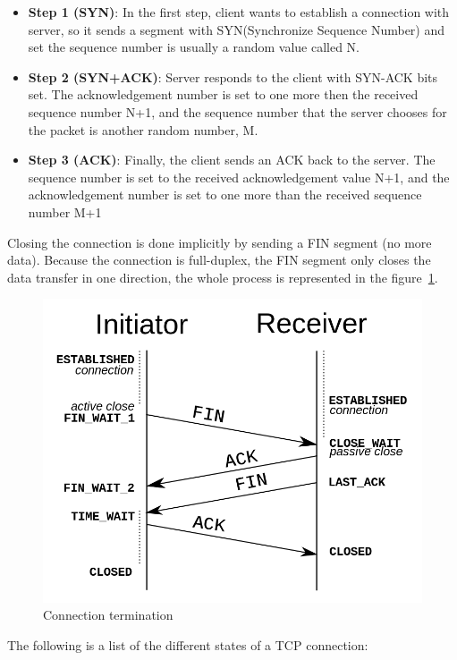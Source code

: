 \documentclass[a4paper, 11pt]{article}
\begin{document}
\begin{itemize}
\item \textbf{Step 1 (SYN)}:  In the first step, client wants to establish a connection with server, so it sends a segment with SYN(Synchronize Sequence Number) and set the sequence number is usually a random value called N.
\item \textbf{Step 2 (SYN+ACK)}: Server responds to the client with SYN-ACK bits set. The acknowledgement number is set to one more then the received sequence number N+1, and the sequence number that the server chooses for the packet is another random number, M.
\item \textbf{Step 3 (ACK)}: Finally, the client sends an ACK back to the server. The sequence number is set to the received acknowledgement value N+1, and the acknowledgement number is set to one more than the received sequence number M+1
\end{itemize}

Closing the connection is done implicitly by sending a FIN segment (no more data). Because the connection is full-duplex, the FIN segment only closes the data transfer in one direction, the whole process is represented in the figure~\ref{fig:tcp-close}. 

\begin{figure}[h]
\includegraphics[scale=0.3]{tcp-close.png}
\caption{Connection termination}
\label{fig:tcp-close}
\end{figure}

The following is a list of the different states of a TCP connection:
\end{document}

